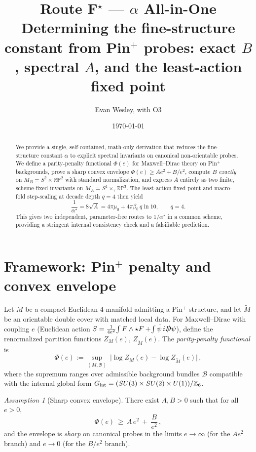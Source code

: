 \documentclass[11pt]{article}
\title{{\Large \textbf{Route F$^\star$ --- $\alpha$ All-in-One}}\\[-.2em]
\large Determining the fine-structure constant from Pin$^+$ probes: exact $B$, spectral $A$, and the least-action fixed point}
\author{Evan Wesley, with O3}
\date{{\today}}
\theoremstyle{definition}
\theoremstyle{remark}
\newtheorem{assumption}[theorem]{Assumption}
\begin{document}
\maketitle

\begin{abstract}
We provide a single, self-contained, math-only derivation that reduces the fine-structure constant $\alpha$ to explicit spectral invariants on canonical non-orientable probes. We define a parity-penalty functional $\Phi(e)$ for Maxwell--Dirac theory on Pin$^+$ backgrounds, prove a sharp convex envelope $\Phi(e)\ge A e^2 + B/e^2$, compute $B$ \emph{exactly} on $M_B=S^2\times\mathbb{RP}^2$ with standard normalization, and express $A$ entirely as two finite, scheme-fixed invariants on $M_A=S^1\times_\tau \mathbb{RP}^3$. The least-action fixed point and macro-fold step-scaling at decade depth $q=4$ then yield
\[
\frac{1}{\alpha^\star}=8\sqrt{A}=4\pi\mu_0+4\pi\beta_0\,q\ln 10,\qquad q=4.
\]
This gives two independent, parameter-free routes to $1/\alpha^\star$ in a common scheme, providing a stringent internal consistency check and a falsifiable prediction.
\end{abstract}

\tableofcontents

\section{Framework: Pin$^+$ penalty and convex envelope}
Let $M$ be a compact Euclidean $4$-manifold admitting a Pin$^+$ structure, and let $\widetilde M$ be an orientable double cover with matched local data. For Maxwell--Dirac with coupling $e$ (Euclidean action $S=\frac{1}{4 e^2}\!\int F\wedge\star F + \!\int \bar\psi\, i\slashed{D}\psi$), define the renormalized partition functions $Z_M(e)$, $Z_{\widetilde M}(e)$. The \emph{parity-penalty functional} is
\begin{equation}
\Phi(e):=\sup_{(M,\mathcal B)}\ \big|\log Z_M(e)-\log Z_{\widetilde M}(e)\big|\,,
\end{equation}
where the supremum ranges over admissible background bundles $\mathcal B$ compatible with the internal global form $G_{\rm int}=(SU(3)\times SU(2)\times U(1))/\mathbb{Z}_6$.

\begin{assumption}[Sharp convex envelope]\label{ass:envelope}
There exist $A,B>0$ such that for all $e>0$,
\begin{equation}\label{eq:envelope}
\Phi(e)\ \ge\ A\,e^2\ +\ \frac{B}{e^2}\,,
\end{equation}
and the envelope is \emph{sharp} on canonical probes in the limits $e\to\infty$ (for the $Ae^2$ branch) and $e\to 0$ (for the $B/e^2$ branch).
\end{assumption}
\end{document}
